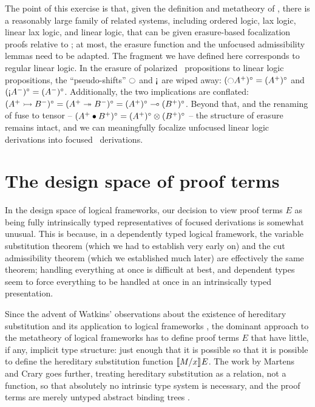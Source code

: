 The point of this exercise is that, given the definition and
metatheory of \ollll, there is a reasonably large family of related
systems, including ordered logic, lax logic, linear lax logic, and
linear logic, that can be given erasure-based focalization proofs
relative to \ollll; at most, the erasure function and the unfocused
admissibility lemmas need to be adapted. The fragment we have defined
here corresponds to regular linear logic. In the erasure of polarized
\ollll~propositions to linear logic propositions, the
``pseudo-shifts'' ${\ocircle}$ and ${\gnab}$ are wiped away:
$({\ocircle}A^+)^\circ = (A^+)^\circ$ and $({\gnab}A^-)^\circ =
(A^-)^\circ$.  Additionally, the two implications are conflated: $(A^+
\rightarrowtail B^-)^\circ = (A^+ \twoheadrightarrow B^-)^\circ = (A^+)^\circ \multimap
(B^+)^\circ$. Beyond that, and the renaming of fuse to tensor -- $(A^+
\mathbin{\bullet} B^+)^\circ = (A^+)^\circ \otimes (B^+)^\circ$ -- the structure
of erasure remains intact, and we can 
meaningfully focalize unfocused linear logic derivations into focused 
\ollll~derivations.

\section{The design space of proof terms}
\label{sec:intrinsic-extrinsic}

In the design space of logical frameworks, our decision to view
proof terms $E$ as being fully intrinsically typed representatives
of focused derivations is somewhat unusual. This is because, in 
a dependently typed logical framework, the variable substitution
theorem (which we had to establish very early on) and the cut 
admissibility theorem (which we established much later) are effectively
the same theorem; handling everything at once is difficult at best,
and dependent types seem to force everything to be handled at once in
an intrinsically typed presentation.

Since the advent of Watkins' observations about the existence of
hereditary substitution and its application to logical frameworks
\cite{watkins02concurrent}, the dominant approach to the metatheory of
logical frameworks has to define proof terms $E$ that have little, if
any, implicit type structure: just enough that it is possible so that
it is possible to define the hereditary substitution function
$\llbracket {M}/{x} \rrbracket^{} {E}$. The work by Martens and Crary goes further,
treating hereditary substitution as a relation, not a function, so
that absolutely no intrinsic type system is necessary, and the proof
terms are merely untyped abstract binding trees
\cite{martens11mechanizing}.

